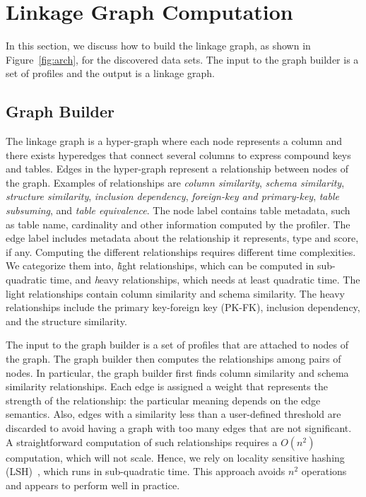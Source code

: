 \section{Linkage Graph Computation}
\label{sec:stitching}
In this section, we discuss how to build the linkage graph, as shown in
Figure~\ref{fig:arch}, for the discovered data sets. The input to the graph
builder is a set of profiles and the output is a linkage graph.

\subsection{Graph Builder}
\label{subsec:graphbuild}

The linkage graph is a hyper-graph
where each node represents a column and there exists hyperedges that connect
several columns to express compound keys and tables. Edges in the hyper-graph
represent a relationship between nodes of the graph. Examples of relationships are 
\emph{column similarity}, 
\emph{schema similarity}, 
\emph{structure similarity}, %
\emph{inclusion dependency}, 
\emph{foreign-key and primary-key}, 
\emph{table subsuming}, and 
\emph{table equivalence}. 
The node label contains table metadata, such as table name, cardinality and
other information computed by the profiler. The edge label includes metadata
about the relationship it represents, \eg type and score, if any. Computing
the different relationships requires different time complexities. We 
categorize them into, {\textit light relationships}, which can be computed in
sub-quadratic time, and {\textit heavy relationships}, which needs at least
quadratic time. The light relationships contain column similarity and schema
similarity. The heavy relationships include the primary key-foreign key
(PK-FK), inclusion dependency, and the structure similarity. 

The input to the graph builder is a set of profiles that are attached to nodes
of the graph.  The graph builder then computes the relationships among pairs of
nodes. In particular, the graph builder first finds column similarity and
schema similarity relationships.  Each edge is assigned a weight that represents
the strength of the relationship: the particular meaning depends on the edge
semantics.  Also, edges with a similarity less than a user-defined threshold are
discarded to avoid having a graph with too many edges that are not significant.
A straightforward computation of such relationships requires a $O(n^2)$
computation, which will not scale.  Hence, we rely on locality sensitive hashing
(LSH)~\cite{DBLP:conf/compgeom/DatarIIM04}, which runs in sub-quadratic time.
This approach avoids $n^2$ operations and appears to perform well in practice.

